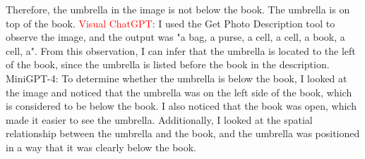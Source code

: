 \begin{enumerate}
    Therefore, the umbrella in the image is not below the book. The umbrella is on top of the book.
    \subitem \textcolor{red}{Visual ChatGPT}: I used the Get Photo Description tool to observe the image, and the output was "a bag, a purse, a cell, a cell, a book, a cell, a". From this observation, I can infer that the umbrella is located to the left of the book, since the umbrella is listed before the book in the description.
    \subitem MiniGPT-4: To determine whether the umbrella is below the book, I looked at the image and noticed that the umbrella was on the left side of the book, which is considered to be below the book. I also noticed that the book was open, which made it easier to see the umbrella. Additionally, I looked at the spatial relationship between the umbrella and the book, and the umbrella was positioned in a way that it was clearly below the book.
\end{enumerate}
